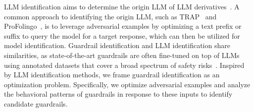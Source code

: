 LLM identification aims to determine the origin LLM of LLM derivatives~\cite{DCS21, ZZWL23, MSSA24, GULYO24, JZSLH24}.
A common approach to identifying the origin LLM, such as TRAP~\cite{GULYO24} and ProFolingo~\cite{JZSLH24}, is to leverage adversarial examples by optimizing a text prefix or suffix to query the model for a target response, which can then be utilized for model identification.
Guardrail identification and LLM identification share similarities, as state-of-the-art guardrails are often fine-tuned on top of LLMs using annotated datasets that cover a broad spectrum of safety risks~\cite{IUCRIMTHFTK23,HREJLLCD24,ZLMPFHNPKRSW24}.
Inspired by LLM identification methods, we frame guardrail identification as an optimization problem.
Specifically, we optimize adversarial examples and analyze the behavioral patterns of guardrails in response to these inputs to identify candidate guardrails.

